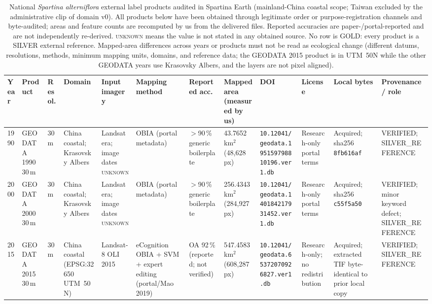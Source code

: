 \begin{table}
\centering
\scriptsize
\setlength{\tabcolsep}{3pt}
\caption{National \emph{Spartina alterniflora} external label products
audited in Spartina Earth (mainland-China coastal scope; Taiwan excluded
by the administrative clip of domain v0). All products below have been
obtained through legitimate order or purpose-registration channels and
byte-audited; areas and feature counts are recomputed by us from the
delivered files. Reported accuracies are paper-/portal-reported and are
not independently re-derived. \textsc{unknown} means the value is not
stated in any obtained source. No row is GOLD: every product is a SILVER
external reference. Mapped-area differences across years or products
must not be read as ecological change (different datums, resolutions,
methods, minimum mapping units, domains, and reference data; the
GEODATA 2015 product is in UTM~50N while the other GEODATA years use
Krasovsky Albers, and the layers are not pixel aligned).}
\label{tab:labelproducts}
\begin{tabular}{p{0.9cm}p{1.75cm}p{1.2cm}p{1.7cm}p{2.55cm}p{2.7cm}p{1.75cm}p{1.7cm}p{1.95cm}p{1.7cm}p{1.7cm}p{1.85cm}}
\toprule
Year & Product & Resol. & Domain & Input imagery & Mapping method & Reported acc. & Mapped area (measured by us) & DOI & License & Local bytes & Provenance / role \\
\midrule
1990 & GEODATA 1990 30\,m & 30\,m & China coastal; Krasovsky Albers & Landsat era; image dates \textsc{unknown} & OBIA (portal metadata) & $>$90\,\% generic boilerplate & 43.7652\,km$^2$ (48{,}628 px) & \nolinkurl{10.12041/geodata.195159798810196.ver1.db} & Research-only portal terms & Acquired; sha256 \texttt{8fb616af} & VERIFIED; SILVER\_REFERENCE \\
2000 & GEODATA 2000 30\,m & 30\,m & China coastal; Krasovsky Albers & Landsat era; image dates \textsc{unknown} & OBIA (portal metadata) & $>$90\,\% generic boilerplate & 256.4343\,km$^2$ (284{,}927 px) & \nolinkurl{10.12041/geodata.140184217931452.ver1.db} & Research-only portal terms & Acquired; sha256 \texttt{c55f5a50} & VERIFIED; minor keyword defect; SILVER\_REFERENCE \\
2015 & GEODATA 2015 30\,m & 30\,m & China coastal (EPSG:32650 UTM~50N) & Landsat-8 OLI 2015 & eCognition OBIA + SVM + expert editing (portal/Mao 2019) & OA 92\,\% (reported; not verified) & 547.4583\,km$^2$ (608{,}287 px) & \nolinkurl{10.12041/geodata.65372070926827.ver1.db} & Research-only; no redistribution & Acquired; extracted TIF byte-identical to prior local copy & VERIFIED; SILVER\_REFERENCE \\

\end{tabular}
\end{table}
